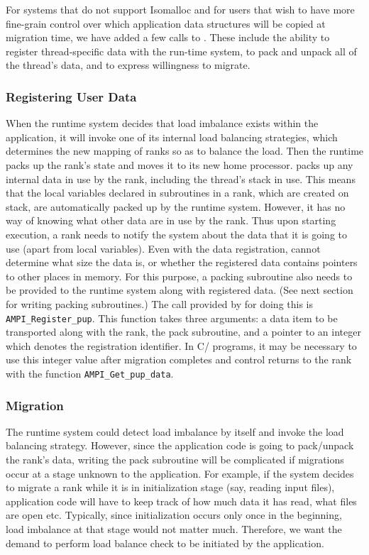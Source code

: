 \documentclass[10pt]{article}
\begin{document}
For systems that do not support Isomalloc and for users that wish to have more
fine-grain control over which application data structures will be copied at
migration time, we have added a few calls to \ampi{}. These include
the ability to register thread-specific data with the run-time system, to pack
and unpack all of the thread's data, and to express willingness to migrate.

\subsubsection{Registering User Data}

When the \ampi{} runtime system decides that load imbalance exists within the
application, it will invoke one of its internal load balancing strategies,
which determines the new mapping of \ampi{} ranks so as to balance the load.
Then the \ampi{} runtime packs up the rank's state and moves it to its new
home processor. \ampi{} packs up any internal data in use by the rank,
including the thread's stack in use. This means that the local variables
declared in subroutines in a rank, which are created on stack, are
automatically packed up by the \ampi{} runtime system. However, it has no way
of knowing what other data are in use by the rank. Thus upon starting
execution, a rank needs to notify the system about the data that it is going
to use (apart from local variables). Even with the data registration, \ampi{}
cannot determine what size the data is, or whether the registered data contains
pointers to other places in memory. For this purpose, a packing subroutine also
needs to be provided to the \ampi{} runtime system along with registered data.
(See next section for writing packing subroutines.) The call provided by
\ampi{} for doing this is \texttt{AMPI\_Register\_pup}. This function takes three
arguments: a data item to be transported along with the rank, the pack
subroutine, and a pointer to an integer which denotes the registration identifier.
In C/\CC{} programs, it may be necessary to use this integer value after migration
completes and control returns to the rank with the function
\texttt{AMPI\_Get\_pup\_data}.

\subsubsection{Migration}

The \ampi{} runtime system could detect load imbalance by itself and invoke the
load balancing strategy. However, since the application code is going to
pack/unpack the rank's data, writing the pack subroutine will be complicated
if migrations occur at a stage unknown to the application. For example, if the
system decides to migrate a rank while it is in initialization stage (say,
reading input files), application code will have to keep track of how much data
it has read, what files are open etc. Typically, since initialization occurs
only once in the beginning, load imbalance at that stage would not matter much.
Therefore, we want the demand to perform load balance check to be initiated by
the application.
\end{document}
